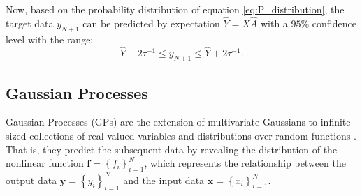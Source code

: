 \documentclass[final,authoryear,5p,times,twocolumn]{elsarticle}
\begin{document}
Now, based on the probability distribution of equation \eqref{eq:P_distribution}, the target data $y_{N+1}$ can be predicted by expectation $\hat{Y}=X\hat{A}$ with a $95\%$ confidence level with the range:
\[
\hat{Y}-2\tau^{-1}  \leq y_{N+1} \leq \hat{Y}+2\tau^{-1}.
\]



\subsection{Gaussian Processes}
\label{section:Sec3.2}
Gaussian Processes (GPs) are the extension of multivariate Gaussians to infinite-sized collections of real-valued variables and distributions over random functions \citep{GP08}. That is, they predict the subsequent data by revealing the distribution of the nonlinear function $\mathbf{f}=\left \{ f_i \right \}_{i=1}^N$, which represents the relationship between the output data $\mathbf{y}=\left \{ y_i \right \}_{i=1}^N$ and the input data $\mathbf{x}=\left \{ x_i \right \}_{i=1}^N$.
\end{document}
